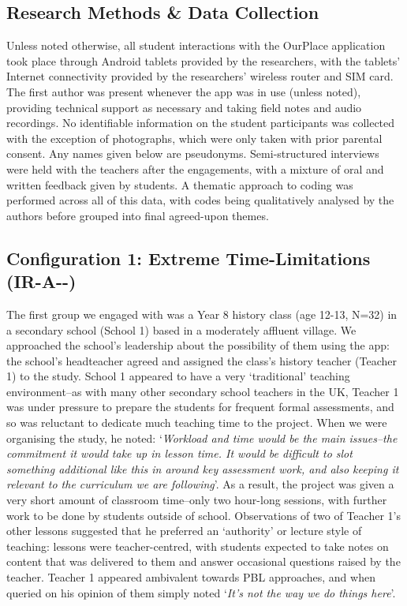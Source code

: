 \documentclass[,hyphens]{sigchi}
\begin{document}
\subsection{Research Methods \& Data Collection}

Unless noted otherwise, all student interactions with the OurPlace application took place through Android tablets provided by the researchers, with the tablets' Internet connectivity provided by the researchers' wireless router and SIM card. The first author was present whenever the app was in use (unless noted), providing technical support as necessary and taking field notes and audio recordings. No identifiable information on the student participants was collected with the exception of photographs, which were only taken with prior parental consent. Any names given below are pseudonyms. Semi-structured interviews were held with the teachers after the engagements, with a mixture of oral and written feedback given by students. A thematic approach to coding was performed across all of this data, with codes being qualitatively analysed by the authors before grouped into final agreed-upon themes.

\subsection{Configuration 1: Extreme Time-Limitations (IR-A-\--)}
The first group we engaged with was a Year 8 history class (age 12-13, N=32) in a secondary school (School 1) based in a moderately affluent village. We approached the school's leadership about the possibility of them using the app: the school's headteacher agreed and assigned the class's history teacher (Teacher 1) to the study. School 1 appeared to have a very `traditional' teaching environment--as with many other secondary school teachers in the UK, Teacher 1 was under pressure to prepare the students for frequent formal assessments, and so was reluctant to dedicate much teaching time to the project. When we were organising the study, he noted: `\textit{Workload and time would be the main issues--the commitment it would take up in lesson time. It would be difficult to slot something additional like this in around key assessment work, and also keeping it relevant to the curriculum we are following}'. As a result, the project was given a very short amount of classroom time--only two hour-long sessions, with further work to be done by students outside of school. Observations of two of Teacher 1's other lessons suggested that he preferred an `authority' or lecture style of teaching: lessons were teacher-centred, with students expected to take notes on content that was delivered to them and answer occasional questions raised by the teacher. Teacher 1 appeared ambivalent towards PBL approaches, and when queried on his opinion of them simply noted `\textit{It's not the way we do things here}'.
\end{document}

